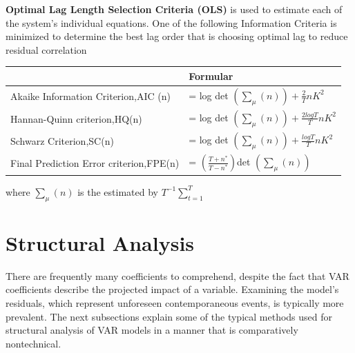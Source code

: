 \textbf{Optimal Lag Length Selection Criteria (OLS)}  is used to estimate each of the system's individual equations. One of the following Information Criteria is minimized to determine the best lag order that is choosing optimal lag  to reduce residual correlation
\begin{center}
		\begin{tabular}{ll}
			\multicolumn{1}{c}{}Criteria &  Formular \\ \midrule
			Akaike Information Criterion,AIC (n)  & = log det $ \displaystyle\left(\sum _{\mu}(n)\right)+ \frac{2}{T}nK^{2}$\\
			Hannan-Quinn criterion,HQ(n)    & = log det  $ \displaystyle\left(\sum _{\mu}(n)\right)+ \frac{2logT}{T}nK^{2}$\\
			Schwarz Criterion,SC(n)    & = log det  $ \displaystyle\left(\sum _{\mu}(n)\right)+ \frac{logT}{T}nK^{2}$\\
			Final Prediction Error criterion,FPE(n)   & =          $\displaystyle \left(\frac{T + n^{*}}{T - n^{*}}\right)$det $\displaystyle \left(\sum_{\mu}(n)\right)$\\ \bottomrule
		\end{tabular}
\end{center}
where $ \displaystyle \sum_{\mu} (n)$ is the estimated by $T^{-1}\sum_{t=1}^{T}$
\section{Structural Analysis}
There are frequently many coefficients to comprehend, despite the fact that VAR coefficients describe the projected impact of a variable. Examining the model's residuals, which represent unforeseen contemporaneous events, is typically more prevalent. The next subsections explain some of the typical methods used for structural analysis of VAR models in a manner that is comparatively nontechnical.
